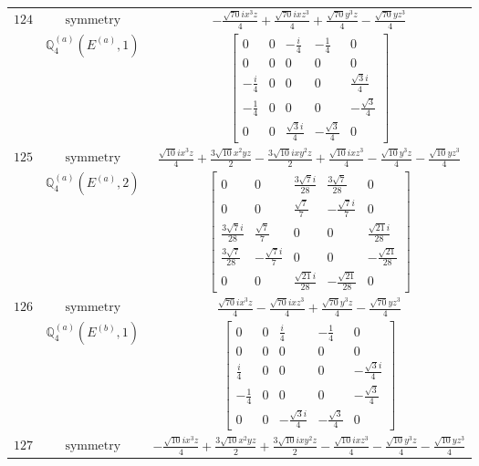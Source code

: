 \documentclass[fleqn,8pt,landscape]{jsarticle}
\begin{document}
\begin{longtable}{ccc}
$ 124 $ & $ \text{symmetry} $ & $ - \frac{\sqrt{70} i x^{3} z}{4} + \frac{\sqrt{70} i x z^{3}}{4} + \frac{\sqrt{70} y^{3} z}{4} - \frac{\sqrt{70} y z^{3}}{4} $ \\
$  $ & $ \mathbb{Q}_{4}^{(a)}(E^{(a)},1) $ & $ \begin{bmatrix} 0 & 0 & - \frac{i}{4} & - \frac{1}{4} & 0 \\ 0 & 0 & 0 & 0 & 0 \\ - \frac{i}{4} & 0 & 0 & 0 & \frac{\sqrt{3} i}{4} \\ - \frac{1}{4} & 0 & 0 & 0 & - \frac{\sqrt{3}}{4} \\ 0 & 0 & \frac{\sqrt{3} i}{4} & - \frac{\sqrt{3}}{4} & 0 \end{bmatrix} $ \\ \hline
$ 125 $ & $ \text{symmetry} $ & $ \frac{\sqrt{10} i x^{3} z}{4} + \frac{3 \sqrt{10} x^{2} y z}{2} - \frac{3 \sqrt{10} i x y^{2} z}{2} + \frac{\sqrt{10} i x z^{3}}{4} - \frac{\sqrt{10} y^{3} z}{4} - \frac{\sqrt{10} y z^{3}}{4} $ \\
$  $ & $ \mathbb{Q}_{4}^{(a)}(E^{(a)},2) $ & $ \begin{bmatrix} 0 & 0 & \frac{3 \sqrt{7} i}{28} & \frac{3 \sqrt{7}}{28} & 0 \\ 0 & 0 & \frac{\sqrt{7}}{7} & - \frac{\sqrt{7} i}{7} & 0 \\ \frac{3 \sqrt{7} i}{28} & \frac{\sqrt{7}}{7} & 0 & 0 & \frac{\sqrt{21} i}{28} \\ \frac{3 \sqrt{7}}{28} & - \frac{\sqrt{7} i}{7} & 0 & 0 & - \frac{\sqrt{21}}{28} \\ 0 & 0 & \frac{\sqrt{21} i}{28} & - \frac{\sqrt{21}}{28} & 0 \end{bmatrix} $ \\ \hline
$ 126 $ & $ \text{symmetry} $ & $ \frac{\sqrt{70} i x^{3} z}{4} - \frac{\sqrt{70} i x z^{3}}{4} + \frac{\sqrt{70} y^{3} z}{4} - \frac{\sqrt{70} y z^{3}}{4} $ \\
$  $ & $ \mathbb{Q}_{4}^{(a)}(E^{(b)},1) $ & $ \begin{bmatrix} 0 & 0 & \frac{i}{4} & - \frac{1}{4} & 0 \\ 0 & 0 & 0 & 0 & 0 \\ \frac{i}{4} & 0 & 0 & 0 & - \frac{\sqrt{3} i}{4} \\ - \frac{1}{4} & 0 & 0 & 0 & - \frac{\sqrt{3}}{4} \\ 0 & 0 & - \frac{\sqrt{3} i}{4} & - \frac{\sqrt{3}}{4} & 0 \end{bmatrix} $ \\ \hline
$ 127 $ & $ \text{symmetry} $ & $ - \frac{\sqrt{10} i x^{3} z}{4} + \frac{3 \sqrt{10} x^{2} y z}{2} + \frac{3 \sqrt{10} i x y^{2} z}{2} - \frac{\sqrt{10} i x z^{3}}{4} - \frac{\sqrt{10} y^{3} z}{4} - \frac{\sqrt{10} y z^{3}}{4} $ \\

\end{longtable}
\end{document}

